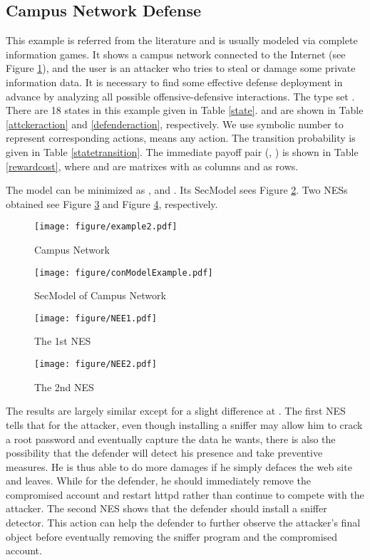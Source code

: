 \documentclass[10pt, conference, compsocconf]{IEEEtran}
\begin{document}
\subsection{Campus Network Defense}
This example is referred from the literature \cite{klye} and is usually modeled via complete information games.
It shows a campus network connected to the Internet (see Figure \ref{example1}), and the user is an attacker who tries to steal or damage some private information data.
It is necessary to find some effective defense deployment in advance by analyzing all possible offensive-defensive interactions.
The type set .
There are 18 states in this example given in Table \ref{state}.
 and  are shown in Table \ref{attckeraction} and \ref{defenderaction}, respectively.
We use symbolic number to represent corresponding actions,  means any action.
The transition probability  is given in Table \ref{statetransition}.
The immediate payoff pair (, ) is shown in Table \ref{rewardcost}, where  and  are matrixes with  as columns and  as rows.

The model can be minimized as ,  and . Its SecModel sees Figure \ref{ComModelcasestudy}.
Two NESs obtained see Figure \ref{nash1} and Figure \ref{nash2}, respectively.
\begin{figure}[h]
\centering
\texttt{[image: figure/example2.pdf]}
\caption{Campus Network}
\label{example1}
\end{figure}
\begin{figure}[h]
\centering
\texttt{[image: figure/conModelExample.pdf]}
\caption{SecModel of Campus Network}
\label{ComModelcasestudy}
\end{figure}
\begin{figure}[h]
\centering
\texttt{[image: figure/NEE1.pdf]}
\caption{The 1st NES}
\label{nash1}
\end{figure}
\begin{figure}[h!t]
\centering
\texttt{[image: figure/NEE2.pdf]}
\caption{The 2nd NES }
\label{nash2}
\end{figure}

The results are largely similar except for a slight difference at . The first NES tells that for the attacker, even though installing a sniffer may allow him to crack a root password and eventually capture the data he wants, there is also the possibility that the defender will detect his presence and take preventive measures.
He is thus able to do more damages if he simply defaces the web site and leaves.
While for the defender, he should immediately remove the compromised account and restart httpd rather than continue to compete with the attacker.
The second NES shows that the defender should install a sniffer detector. This action can help the defender to further observe the attacker's final object before eventually removing the sniffer program and the compromised account.
\end{document}
